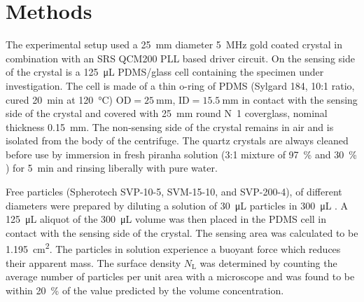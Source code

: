 \documentclass[floatfix,superscriptaddress,a4paper,twocolumn]{revtex4-1}
\begin{document}
\section*{Methods}
\label{sec:materials}
The experimental setup used a \SI{25}{\milli\meter} diameter
\SI{5}{\mega\hertz} gold coated crystal in combination with an SRS QCM200
PLL based driver circuit.  On the sensing side of the crystal is a
\SI{125}{\micro\liter} PDMS/glass cell containing the specimen under
investigation.  The cell is made of a thin o-ring of PDMS (Sylgard 184,
10:1 ratio, cured \SI{20}{\minute} at \SI{120}{\celsius})
$\text{OD}=\SI{25}{\milli\meter}$, $\text{ID}=\SI{15.5}{\milli\meter}$ in
contact with the sensing side of the crystal and covered with
\SI{25}{\milli\meter} round N~1
coverglass, nominal thickness \SI{0.15}{\milli\meter}.  The non-sensing
side of the crystal remains in air and is isolated from the body of the
centrifuge.  The quartz crystals are always cleaned before use by immersion
in fresh piranha solution (3:1 mixture of \SI{97}{\percent}  and
\SI{30}{\percent} ) for \SI{5}{\minute} and rinsing liberally with
pure water.

Free particles (Spherotech SVP-10-5, SVM-15-10, and SVP-200-4), of
different diameters were prepared by diluting a solution of
\SI{30}{\micro\liter} particles in \SI{300}{\micro\liter} .  A
\SI{125}{\micro\liter} aliquot of the \SI{300}{\micro\liter} volume was
then placed in the PDMS cell in contact with the sensing side of the
crystal.  The sensing area was calculated to be
\SI{1.195}{\centi\meter\squared}.  The particles in solution experience a
buoyant force which reduces their apparent mass. The surface density
$N_\mathrm{L}$ was determined by counting the average number of particles
per unit area with a microscope and was found to be within
\SI{20}{\percent} of the value predicted by the volume concentration.
\end{document}
